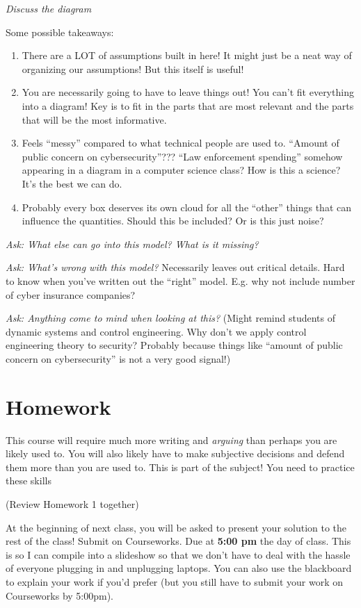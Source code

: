 \documentclass[11pt]{article}
\begin{document}
{\it Discuss the diagram}

Some possible takeaways:
\begin{enumerate}
    \item There are a LOT of assumptions built in here! It might just be a neat way of organizing our assumptions! But this itself is useful!
    \item You are necessarily going to have to leave things out! You can't fit everything into a diagram! Key is to fit in the parts that are most relevant and the parts that will be the most informative.
    \item Feels ``messy'' compared to what technical people are used to. ``Amount of public concern on cybersecurity''??? ``Law enforcement spending'' somehow appearing in a diagram in a computer science class? How is this a science? It's the best we can do.
    \item Probably every box deserves its own cloud for all the ``other'' things that can influence the quantities. Should this be included? Or is this just noise?
\end{enumerate}

{\it Ask: What else can go into this model? What is it missing?}

{\it Ask: What's wrong with this model?} Necessarily leaves out critical details. Hard to know when you've written out the ``right'' model. E.g. why not include number of cyber insurance companies?

{\it Ask: Anything come to mind when looking at this?} (Might remind students of dynamic systems and control engineering. Why don't we apply control engineering theory to security? Probably because things like ``amount of public concern on cybersecurity'' is not a very good signal!)

\section{Homework}

This course will require much more writing and {\it arguing} than perhaps you are likely used to.
You will also likely have to make subjective decisions and defend them more than you are used to. This is part of the subject! You need to practice these skills

(Review Homework 1 together)

At the beginning of next class, you will be asked to present your solution to the rest of the class! Submit on Courseworks. Due at {\bf 5:00 pm} the day of class. This is so I can compile into a slideshow so that we don't have to deal with the hassle of everyone plugging in and unplugging laptops. You can also use the blackboard to explain your work if you'd prefer (but you still have to submit your work on Courseworks by 5:00pm).
\end{document}
